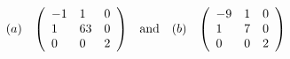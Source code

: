 $$
( a ) \quad { \left( \begin{array} { l l l } { - 1 } & { 1 } & { 0 } \\ { 1 } & { 6 3 } & { 0 } \\ { 0 } & { 0 } & { 2 } \end{array} \right) } \quad { \mathrm { a n d } } \quad ( b ) \quad { \left( \begin{array} { l l l } { - 9 } & { 1 } & { 0 } \\ { 1 } & { 7 } & { 0 } \\ { 0 } & { 0 } & { 2 } \end{array} \right) }
$$
